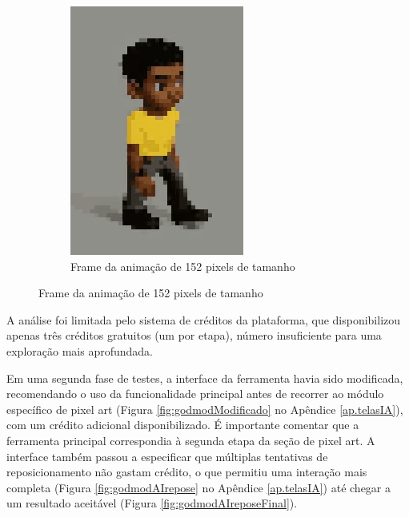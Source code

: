 \begin{figure}[htbp]
\begin{subfigure}{0.21\linewidth}
        \includegraphics[width=0.88\linewidth]{figs/godmodAI/print152.PNG}
        \caption{\small Frame da animação de 152 pixels de tamanho}
        \label{fig:godmodAIFrame152}
    \end{subfigure}

\end{figure}

A análise foi limitada pelo sistema de créditos da plataforma, que disponibilizou apenas três créditos gratuitos (um por etapa), número insuficiente para uma exploração mais aprofundada.

Em uma segunda fase de testes, a interface da ferramenta havia sido modificada, recomendando o uso da funcionalidade principal antes de recorrer ao módulo específico de pixel art (Figura \ref{fig:godmodModificado} no Apêndice \ref{ap.telasIA}), com um crédito adicional disponibilizado. É importante comentar que a ferramenta principal correspondia à segunda etapa da seção de pixel art. A interface também passou a especificar que múltiplas tentativas de reposicionamento não gastam crédito, o que permitiu uma interação mais completa (Figura \ref{fig:godmodAIrepose} no Apêndice \ref{ap.telasIA}) até chegar a um resultado aceitável (Figura \ref{fig:godmodAIreposeFinal}).

